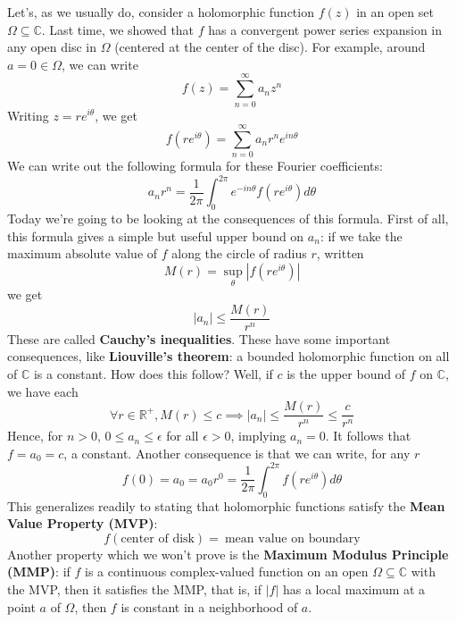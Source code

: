 \documentclass{article}
\newcommand{\mbb}[1]{\mathbb{#1}}
\newcommand{\reals}{\mbb{R}}
\begin{document}
Let's, as we usually do, consider a holomorphic function \(f(z)\) in an open set \(\Omega \subseteq \mbb{C}\). Last time, we showed that \(f\) has a convergent power series expansion in any open disc in \(\Omega\) (centered at the center of the disc). For example, around \(a = 0 \in \Omega\), we can write
\begin{equation}f(z) = \sum_{n = 0}^\infty a_nz^n\end{equation}
Writing \(z = re^{i\theta}\), we get
\begin{equation}f(re^{i\theta}) = \sum_{n = 0}^\infty a_nr^ne^{in\theta}\end{equation}
We can write out the following formula for these Fourier coefficients:
\begin{equation}a_nr^n = \frac{1}{2\pi}\int_0^{2\pi}e^{-in\theta}f(re^{i\theta})d\theta\end{equation}
Today we're going to be looking at the consequences of this formula. First of all, this formula gives a simple but useful upper bound on \(a_n\): if we take the maximum absolute value of \(f\) along the circle of radius \(r\), written
\begin{equation}M(r) = \sup_\theta|f(re^{i\theta})|\end{equation}
we get
\begin{equation}|a_n| \leq \frac{M(r)}{r^n}\end{equation}
These are called \textbf{Cauchy's inequalities}. These have some important consequences, like \textbf{Liouville's theorem}: a bounded holomorphic function on all of \(\mbb{C}\) is a constant. How does this follow? Well, if \(c\) is the upper bound of \(f\) on \(\mbb{C}\), we have each
\begin{equation}\forall r \in \reals^+, M(r) \leq c \implies |a_n| \leq \frac{M(r)}{r^n} \leq \frac{c}{r^n}\end{equation}
Hence, for \(n > 0\), \(0 \leq a_n \leq \epsilon\) for all \(\epsilon > 0\), implying \(a_n = 0\). It follows that \(f = a_0 = c\), a constant. Another consequence is that we can write, for any \(r\)
\begin{equation}f(0) = a_0 = a_0r^0 = \frac{1}{2\pi}\int_0^{2\pi}f(re^{i\theta})d\theta\end{equation}
This generalizes readily to stating that holomorphic functions satisfy the \textbf{Mean Value Property (MVP)}:
\begin{equation}f(\text{center of disk}) = \ \text{mean value on boundary}\end{equation}
Another property which we won't prove is the \textbf{Maximum Modulus Principle (MMP)}: if \(f\) is a continuous complex-valued function on an open \(\Omega \subseteq \mbb{C}\) with the MVP, then it satisfies the MMP, that is, if \(|f|\) has a local maximum at a point \(a\) of \(\Omega\), then \(f\) is constant in a neighborhood of \(a\).
\end{document}
